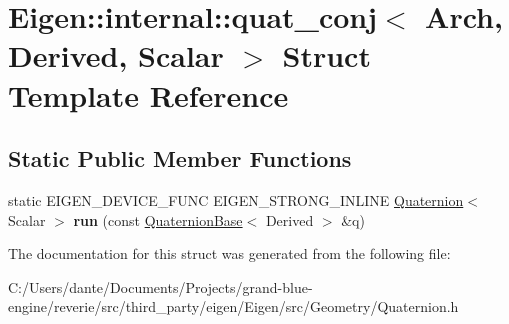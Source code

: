 \hypertarget{struct_eigen_1_1internal_1_1quat__conj}{}\section{Eigen\+::internal\+::quat\+\_\+conj$<$ Arch, Derived, Scalar $>$ Struct Template Reference}
\label{struct_eigen_1_1internal_1_1quat__conj}
\subsection*{Static Public Member Functions}
\begin{DoxyCompactItemize}
\item 
\mbox{\label{struct_eigen_1_1internal_1_1quat__conj_aacb4c3ff28770adad256f1dea67e4d34}} 
static E\+I\+G\+E\+N\+\_\+\+D\+E\+V\+I\+C\+E\+\_\+\+F\+U\+NC E\+I\+G\+E\+N\+\_\+\+S\+T\+R\+O\+N\+G\+\_\+\+I\+N\+L\+I\+NE \mbox{\hyperlink{class_eigen_1_1_quaternion}{Quaternion}}$<$ Scalar $>$ {\bfseries run} (const \mbox{\hyperlink{class_eigen_1_1_quaternion_base}{Quaternion\+Base}}$<$ Derived $>$ \&q)
\end{DoxyCompactItemize}


The documentation for this struct was generated from the following file\+:\begin{DoxyCompactItemize}
\item 
C\+:/\+Users/dante/\+Documents/\+Projects/grand-\/blue-\/engine/reverie/src/third\+\_\+party/eigen/\+Eigen/src/\+Geometry/Quaternion.\+h\end{DoxyCompactItemize}
